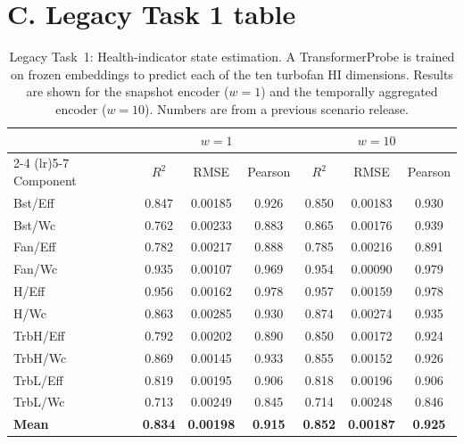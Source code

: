 \section*{C. Legacy Task 1 table}

\begin{table}[h]
\centering
\caption{%
  Legacy Task~1: Health-indicator state estimation.
  A TransformerProbe is trained on frozen embeddings to predict
  each of the ten turbofan HI dimensions.
  Results are shown for the snapshot encoder ($w{=}1$) and the
  temporally aggregated encoder ($w{=}10$). Numbers are from a
  previous scenario release.
}
\label{tab:legacy_task1}
\setlength{\tabcolsep}{5pt}
\begin{tabular}{lcccccc}
\toprule
& \multicolumn{3}{c}{$w = 1$} & \multicolumn{3}{c}{$w = 10$} \\
\cmidrule(lr){2-4} \cmidrule(lr){5-7}
Component & $R^2$ & RMSE & Pearson & $R^2$ & RMSE & Pearson \\
\midrule
Bst/Eff    & 0.847 & 0.00185 & 0.926 & 0.850 & 0.00183 & 0.930 \\
Bst/Wc     & 0.762 & 0.00233 & 0.883 & 0.865 & 0.00176 & 0.939 \\
Fan/Eff    & 0.782 & 0.00217 & 0.888 & 0.785 & 0.00216 & 0.891 \\
Fan/Wc     & 0.935 & 0.00107 & 0.969 & 0.954 & 0.00090 & 0.979 \\
H/Eff      & 0.956 & 0.00162 & 0.978 & 0.957 & 0.00159 & 0.978 \\
H/Wc       & 0.863 & 0.00285 & 0.930 & 0.874 & 0.00274 & 0.935 \\
TrbH/Eff   & 0.792 & 0.00202 & 0.890 & 0.850 & 0.00172 & 0.924 \\
TrbH/Wc    & 0.869 & 0.00145 & 0.933 & 0.855 & 0.00152 & 0.926 \\
TrbL/Eff   & 0.819 & 0.00195 & 0.906 & 0.818 & 0.00196 & 0.906 \\
TrbL/Wc    & 0.713 & 0.00249 & 0.845 & 0.714 & 0.00248 & 0.846 \\
\midrule
\textbf{Mean} & \textbf{0.834} & \textbf{0.00198} & \textbf{0.915}
              & \textbf{0.852} & \textbf{0.00187} & \textbf{0.925} \\
\bottomrule
\end{tabular}
\end{table}


